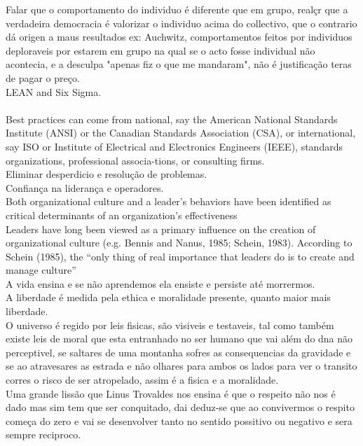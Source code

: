 Falar que o comportamento do individuo é diferente que em grupo, realçr que a verdadeira democracia é valorizar o individuo acima do collectivo, que o contrario dá origen a maus resultados ex: Auchwitz, comportamentos feitos por individuos deploraveis por estarem em grupo na qual se o acto fosse individual não acontecia, e a desculpa "apenas fiz o que me mandaram", não é justificação teras de pagar o preço.\\


LEAN and Six Sigma.\\
\\
Best practices can come from national, say the American National Standards Institute (ANSI) or the Canadian Standards Association (CSA), or international, say ISO or Institute of Electrical and Electronics Engineers (IEEE), standards organizations, professional associa-tions, or consulting firms.\\

Eliminar desperdicio e resolução de problemas.\\

Confiança na liderança e operadores.\\
Both organizational culture and a leader’s behaviors have been identified as critical determinants of an organization’s effectiveness\\
Leaders have long been viewed as a primary influence on the creation of organizational culture (e.g. Bennis and Nanus, 1985; Schein, 1983). According to Schein (1985), the “only thing of real importance that leaders do is to create and manage culture”\\


A vida ensina e se não aprendemos ela ensiste e persiste até morrermos.\\

A liberdade é medida pela ethica e moralidade presente, quanto maior mais liberdade.\\


O universo é regido por leis fisicas, são visiveis e testaveis, tal como também existe leis de moral que esta entranhado no ser humano que vai além do dna não perceptivel, se saltares de uma montanha sofres as consequencias da gravidade e se ao atravesares as estrada e não olhares para ambos os lados para ver o transito corres o risco de ser atropelado, assim é a fisica e a moralidade.\\

Uma grande lissão que Linus Trovaldes nos ensina é que o respeito não nos é dado mas sim tem que ser conquitado, dai deduz-se que ao convivermos o respito começa do zero e vai se desenvolver tanto no sentido possitivo ou negativo e sera sempre reciproco.\\


